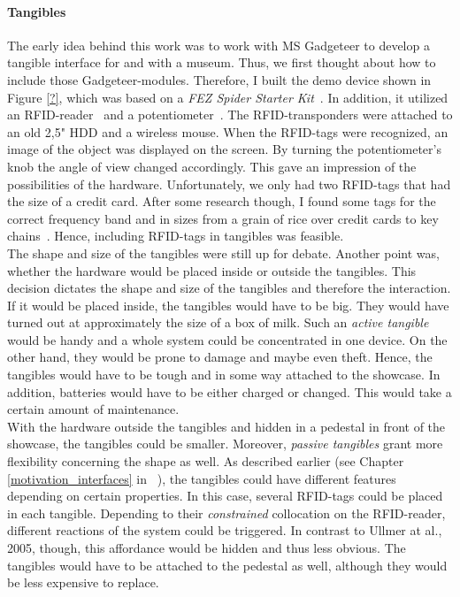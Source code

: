 \paragraph{Tangibles} 

The early idea behind this work was to work with \ac{MS} Gadgeteer to develop a tangible interface for and with a museum. Thus, we first thought about how to include those Gadgeteer-modules. Therefore, I built the demo device shown in Figure \ref{?}, which was based on a \textit{FEZ Spider Starter Kit}~\cite{SpiderKitGHI}. In addition, it utilized an \ac{RFID}-reader~\cite{RFIDreaderGHI} and a potentiometer~\cite{PotentiometerGHI}. The RFID-transponders were attached to an old 2,5" \ac{HDD} and a wireless mouse. When the \ac{RFID}-tags were recognized, an image of the object was displayed on the screen. By turning the potentiometer's knob the angle of view changed accordingly. This gave an impression of the possibilities of the hardware. Unfortunately, we only had two \ac{RFID}-tags that had the size of a credit card. After some research though, I found some tags for the correct frequency band and in sizes from a grain of rice over credit cards to key chains~\cite{RFIDtransponder}. Hence, including \ac{RFID}-tags in tangibles was feasible. 
\\
The shape and size of the tangibles were still up for debate. Another point was, whether the hardware would be placed inside or outside the tangibles. This decision dictates the shape and size of the tangibles and therefore the interaction. If it would be placed inside, the tangibles would have to be big. They would have turned out at approximately the size of a box of milk. Such an \textit{active tangible} would be handy and a whole system could be concentrated in one device. On the other hand, they would be prone to damage and maybe even theft. Hence, the tangibles would have to be tough and in some way attached to the showcase. In addition, batteries would have to be either charged or changed. This would take a certain amount of maintenance.
\\
With the hardware outside the tangibles and hidden in a pedestal in front of the showcase, the tangibles could be smaller. Moreover, \textit{passive tangibles} grant more flexibility concerning the shape as well. As described earlier (see Chapter \ref{motivation_interfaces} in ~\cite{TangibleUI}), the tangibles could have different features depending on certain properties. In this case, several \ac{RFID}-tags could be placed in each tangible. Depending to their \textit{constrained} collocation on the \ac{RFID}-reader, different reactions of the system could be triggered. In contrast to Ullmer at al., 2005, though, this affordance would be hidden and thus less obvious. The tangibles would have to be attached to the pedestal as well, although they would be less expensive to replace.


